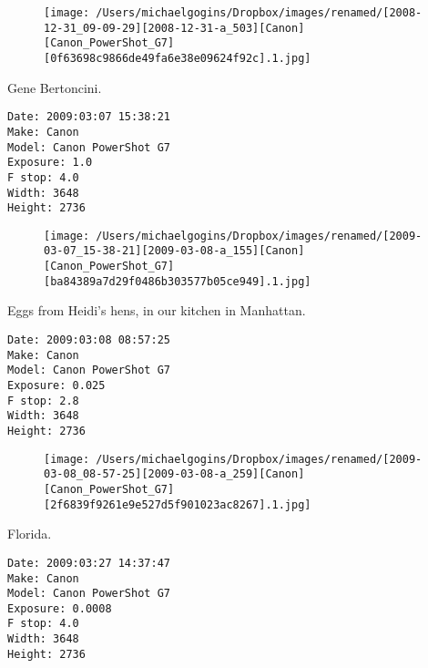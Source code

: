 \documentclass[11pt,letter,DIV=14,paper=landscape]{scrbook}
\begin{document}
\begin{figure}
\texttt{[image: /Users/michaelgogins/Dropbox/images/renamed/[2008-12-31\_09-09-29][2008-12-31-a\_503][Canon][Canon\_PowerShot\_G7][0f63698c9866de49fa6e38e09624f92c].1.jpg]}
\end{figure}
    
\clearpage
\noindent Gene Bertoncini.
\noindent
\begin{lstlisting}
Date: 2009:03:07 15:38:21
Make: Canon
Model: Canon PowerShot G7
Exposure: 1.0
F stop: 4.0
Width: 3648
Height: 2736
\end{lstlisting}
\clearpage

\begin{figure}
\texttt{[image: /Users/michaelgogins/Dropbox/images/renamed/[2009-03-07\_15-38-21][2009-03-08-a\_155][Canon][Canon\_PowerShot\_G7][ba84389a7d29f0486b303577b05ce949].1.jpg]}
\end{figure}
    
\clearpage
\noindent Eggs from Heidi's hens, in our kitchen in Manhattan.
\noindent
\begin{lstlisting}
Date: 2009:03:08 08:57:25
Make: Canon
Model: Canon PowerShot G7
Exposure: 0.025
F stop: 2.8
Width: 3648
Height: 2736
\end{lstlisting}
\clearpage

\begin{figure}
\texttt{[image: /Users/michaelgogins/Dropbox/images/renamed/[2009-03-08\_08-57-25][2009-03-08-a\_259][Canon][Canon\_PowerShot\_G7][2f6839f9261e9e527d5f901023ac8267].1.jpg]}
\end{figure}
    
\clearpage
\noindent Florida.
\noindent
\begin{lstlisting}
Date: 2009:03:27 14:37:47
Make: Canon
Model: Canon PowerShot G7
Exposure: 0.0008
F stop: 4.0
Width: 3648
Height: 2736
\end{lstlisting}
\clearpage
\end{document}
